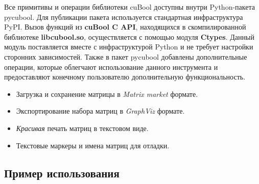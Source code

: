 Все примитивы и операции библиотеки cuBool доступны внутри Python-пакета pycubool.
Для публикации пакета используется стандартная инфраструктура PyPI.
Вызов функций из \textbf{cuBool C API}, находящихся в скомпилированной библиотеке \textbf{libcubool.so}, осуществляется с помощью модуля \textbf{Ctypes}. 
Данный модуль поставляется вместе с инфраструктурой Python и не требует настройки сторонних зависимостей. 
Также в пакет pycubool добавлены дополнительные операции, которые облегчают использование данного инструмента и предоставляют конечному пользователю дополнительную функциональность.

\begin{itemize}[noitemsep,topsep=0pt,parsep=0pt,partopsep=0pt]
    \item Загрузка и сохранение матрицы в \textit{Matrix market} формате.
    \item Экспортирование набора матриц в \textit{GraphViz} формате.
    \item \textit{Красивая} печать матриц в текстовом виде.
    \item Текстовые маркеры и имена матриц для отладки.
\end{itemize}

\subsection{Пример использования}



\lstset{style=codelistingstyle}

